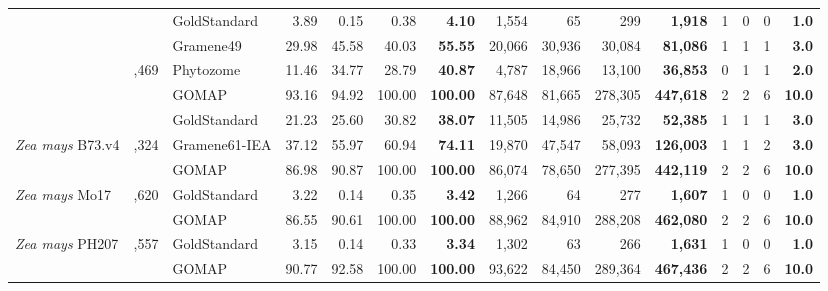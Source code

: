 \documentclass[utf8]{frontiersSCNS}
\begin{document}
\begin{table}[t]
{\begin{threeparttable}
\begin{tabular}{lrlrrr>{\bfseries}r|rrr>{\bfseries}r|rrr>{\bfseries}r}
\rowcolor{gray!6}   &  & GoldStandard & 3.89 & 0.15 & 0.38 & 4.10 & 1,554 & 65 & 299 & 1,918 & 1 & 0 & 0 & 1.0\\

 &  & Gramene49 & 29.98 & 45.58 & 40.03 & 55.55 & 20,066 & 30,936 & 30,084 & 81,086 & 1 & 1 & 1 & 3.0\\

\rowcolor{gray!6}  \multirow{-4}{*}{\raggedright\arraybackslash \textit{Zea mays} B73.v3} & \multirow{-4}{*}{\raggedleft\arraybackslash 39,469} & Phytozome & 11.46 & 34.77 & 28.79 & 40.87 & 4,787 & 18,966 & 13,100 & 36,853 & 0 & 1 & 1 & 2.0\\
\cmidrule{1-15}
 &  & GOMAP & 93.16 & 94.92 & 100.00 & 100.00 & 87,648 & 81,665 & 278,305 & 447,618 & 2 & 2 & 6 & 10.0\\

\rowcolor{gray!6}   &  & GoldStandard & 21.23 & 25.60 & 30.82 & 38.07 & 11,505 & 14,986 & 25,732 & 52,385 & 1 & 1 & 1 & 3.0\\

\multirow{-3}{*}{\raggedright\arraybackslash \textit{Zea mays} B73.v4} & \multirow{-3}{*}{\raggedleft\arraybackslash 39,324} & Gramene61-IEA & 37.12 & 55.97 & 60.94 & 74.11 & 19,870 & 47,547 & 58,093 & 126,003 & 1 & 1 & 2 & 3.0\\
\cmidrule{1-15}
\rowcolor{gray!6}   &  & GOMAP & 86.98 & 90.87 & 100.00 & 100.00 & 86,074 & 78,650 & 277,395 & 442,119 & 2 & 2 & 6 & 10.0\\

\multirow{-2}{*}{\raggedright\arraybackslash \textit{Zea mays} Mo17} & \multirow{-2}{*}{\raggedleft\arraybackslash 38,620} & GoldStandard & 3.22 & 0.14 & 0.35 & 3.42 & 1,266 & 64 & 277 & 1,607 & 1 & 0 & 0 & 1.0\\
\cmidrule{1-15}
\rowcolor{gray!6}   &  & GOMAP & 86.55 & 90.61 & 100.00 & 100.00 & 88,962 & 84,910 & 288,208 & 462,080 & 2 & 2 & 6 & 10.0\\

\multirow{-2}{*}{\raggedright\arraybackslash \textit{Zea mays} PH207} & \multirow{-2}{*}{\raggedleft\arraybackslash 40,557} & GoldStandard & 3.15 & 0.14 & 0.33 & 3.34 & 1,302 & 63 & 266 & 1,631 & 1 & 0 & 0 & 1.0\\
\cmidrule{1-15}
\rowcolor{gray!6}   &  & GOMAP & 90.77 & 92.58 & 100.00 & 100.00 & 93,622 & 84,450 & 289,364 & 467,436 & 2 & 2 & 6 & 10.0\\


\end{tabular}
\end{threeparttable}}
\end{table}
\end{document}
